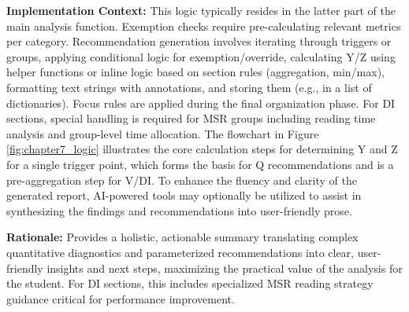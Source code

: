 \documentclass{article}
\begin{document}
\textbf{Implementation Context:} This logic typically resides in the latter part of the main analysis function. Exemption checks require pre-calculating relevant metrics per category. Recommendation generation involves iterating through triggers or groups, applying conditional logic for exemption/override, calculating Y/Z using helper functions or inline logic based on section rules (aggregation, min/max), formatting text strings with annotations, and storing them (e.g., in a list of dictionaries). Focus rules are applied during the final organization phase. For DI sections, special handling is required for MSR groups including reading time analysis and group-level time allocation. The flowchart in Figure \ref{fig:chapter7_logic} illustrates the core calculation steps for determining Y and Z for a single trigger point, which forms the basis for Q recommendations and is a pre-aggregation step for V/DI. To enhance the fluency and clarity of the generated report, AI-powered tools may optionally be utilized to assist in synthesizing the findings and recommendations into user-friendly prose.

\textbf{Rationale:} Provides a holistic, actionable summary translating complex quantitative diagnostics and parameterized recommendations into clear, user-friendly insights and next steps, maximizing the practical value of the analysis for the student. For DI sections, this includes specialized MSR reading strategy guidance critical for performance improvement.
\end{document}
